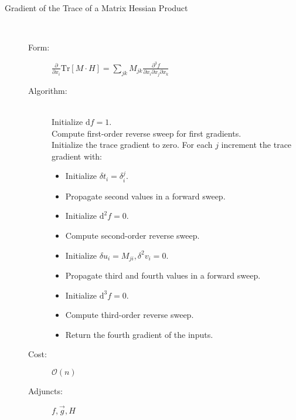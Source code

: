 \begin{description}
	\item[Gradient of the Trace of a Matrix Hessian Product] \hfill \\
	\begin{description}
		\item[Form:] 
		$\displaystyle \frac{\partial}{\partial x_{i} } \mathrm{Tr} \! \left[ M \cdot H \right]
		= \sum_{jk} M_{jk} \frac{ \partial^{3} f }{ \partial x_{i}  \partial x_{j}  \partial x_{k} } $
		\item[Algorithm:] \hfill \\
		Initialize $\mathrm{d} f = 1$. \\
		Compute first-order reverse sweep for first gradients. \\
		Initialize the trace gradient to zero.
		For each $j$ increment the trace gradient with:
		\begin{itemize}
			\setlength{\itemsep}{0cm}
			\setlength{\parskip}{0cm}
			\item[] Initialize $\delta t_{i} = \delta^{j}_{i}$.
			\item[] Propagate second values in a forward sweep. 
			\item[] Initialize $\mathrm{d}^{2} f = 0$.
			\item[] Compute second-order reverse sweep.
			\item[] Initialize $\delta u_{i} = M_{ji}, \delta^{2} v_{i} = 0$.
			\item[] Propagate third and fourth values in a  forward sweep.
			\item[] Initialize $\mathrm{d}^{3} f = 0$.
			\item[] Compute third-order reverse sweep.
			\item[] Return the fourth gradient of the inputs.
		\end{itemize}
		\item[Cost:] $\mathcal{O} \! \left( n \right)$
		\item[Adjuncts:] $ f, \vec{g}, H$
	\end{description}
	
\end{description}
